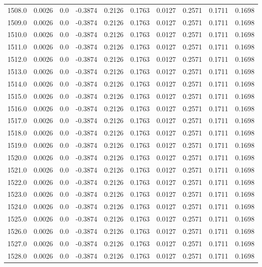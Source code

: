 \begin{longtable}{lrrrrrrrrr}
1508.0 & 0.0026 & 0.0 & -0.3874 & 0.2126 & 0.1763 & 0.0127 & 0.2571 & 0.1711 & 0.1698 \\
1509.0 & 0.0026 & 0.0 & -0.3874 & 0.2126 & 0.1763 & 0.0127 & 0.2571 & 0.1711 & 0.1698 \\
1510.0 & 0.0026 & 0.0 & -0.3874 & 0.2126 & 0.1763 & 0.0127 & 0.2571 & 0.1711 & 0.1698 \\
1511.0 & 0.0026 & 0.0 & -0.3874 & 0.2126 & 0.1763 & 0.0127 & 0.2571 & 0.1711 & 0.1698 \\
1512.0 & 0.0026 & 0.0 & -0.3874 & 0.2126 & 0.1763 & 0.0127 & 0.2571 & 0.1711 & 0.1698 \\
1513.0 & 0.0026 & 0.0 & -0.3874 & 0.2126 & 0.1763 & 0.0127 & 0.2571 & 0.1711 & 0.1698 \\
1514.0 & 0.0026 & 0.0 & -0.3874 & 0.2126 & 0.1763 & 0.0127 & 0.2571 & 0.1711 & 0.1698 \\
1515.0 & 0.0026 & 0.0 & -0.3874 & 0.2126 & 0.1763 & 0.0127 & 0.2571 & 0.1711 & 0.1698 \\
1516.0 & 0.0026 & 0.0 & -0.3874 & 0.2126 & 0.1763 & 0.0127 & 0.2571 & 0.1711 & 0.1698 \\
1517.0 & 0.0026 & 0.0 & -0.3874 & 0.2126 & 0.1763 & 0.0127 & 0.2571 & 0.1711 & 0.1698 \\
1518.0 & 0.0026 & 0.0 & -0.3874 & 0.2126 & 0.1763 & 0.0127 & 0.2571 & 0.1711 & 0.1698 \\
1519.0 & 0.0026 & 0.0 & -0.3874 & 0.2126 & 0.1763 & 0.0127 & 0.2571 & 0.1711 & 0.1698 \\
1520.0 & 0.0026 & 0.0 & -0.3874 & 0.2126 & 0.1763 & 0.0127 & 0.2571 & 0.1711 & 0.1698 \\
1521.0 & 0.0026 & 0.0 & -0.3874 & 0.2126 & 0.1763 & 0.0127 & 0.2571 & 0.1711 & 0.1698 \\
1522.0 & 0.0026 & 0.0 & -0.3874 & 0.2126 & 0.1763 & 0.0127 & 0.2571 & 0.1711 & 0.1698 \\
1523.0 & 0.0026 & 0.0 & -0.3874 & 0.2126 & 0.1763 & 0.0127 & 0.2571 & 0.1711 & 0.1698 \\
1524.0 & 0.0026 & 0.0 & -0.3874 & 0.2126 & 0.1763 & 0.0127 & 0.2571 & 0.1711 & 0.1698 \\
1525.0 & 0.0026 & 0.0 & -0.3874 & 0.2126 & 0.1763 & 0.0127 & 0.2571 & 0.1711 & 0.1698 \\
1526.0 & 0.0026 & 0.0 & -0.3874 & 0.2126 & 0.1763 & 0.0127 & 0.2571 & 0.1711 & 0.1698 \\
1527.0 & 0.0026 & 0.0 & -0.3874 & 0.2126 & 0.1763 & 0.0127 & 0.2571 & 0.1711 & 0.1698 \\
1528.0 & 0.0026 & 0.0 & -0.3874 & 0.2126 & 0.1763 & 0.0127 & 0.2571 & 0.1711 & 0.1698 \\

\end{longtable}
